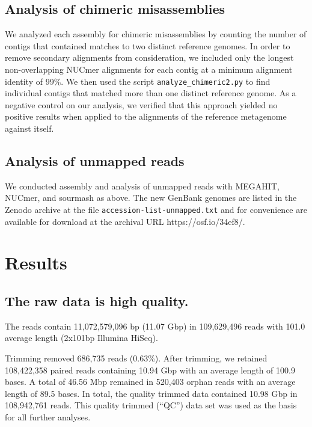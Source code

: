 \documentclass[11pt]{article}
\begin{document}

\subsection*{Analysis of chimeric misassemblies}


We analyzed each assembly for chimeric misassemblies by counting the
number of contigs that contained matches to two distinct reference
genomes.  In order to remove secondary alignments from consideration,
we included only the longest non-overlapping NUCmer
alignments for each contig at a minimum alignment identity of 99\%.
We then used the script {\tt analyze\_chimeric2.py} to find individual
contigs that matched more than one distinct reference genome.  As a
negative control on our analysis, we verified that this approach
yielded no positive results when applied to the alignments of the
reference metagenome against itself.


\subsection*{Analysis of unmapped reads}

We conducted assembly and analysis of unmapped reads with MEGAHIT,
NUCmer, and sourmash as above.  The new GenBank genomes are listed in
the Zenodo archive at the file {\tt accession-list-unmapped.txt} and
for convenience are available for download at the archival URL
https://osf.io/34ef8/.

\section*{Results}

\subsection*{The raw data is high quality.}

The reads contain 11,072,579,096 bp (11.07 Gbp) in 109,629,496 reads
with 101.0 average length (2x101bp Illumina HiSeq).

Trimming removed 686,735 reads (0.63\%).  After trimming, we retained
108,422,358 paired reads containing 10.94 Gbp with an average length of
100.9 bases. A total of 46.56 Mbp remained in 520,403 orphan reads with
an average length of 89.5 bases. In total, the quality trimmed data
contained 10.98 Gbp in 108,942,761 reads.  This quality trimmed (``QC'')
data set was used as the basis for all further analyses.
\end{document}
